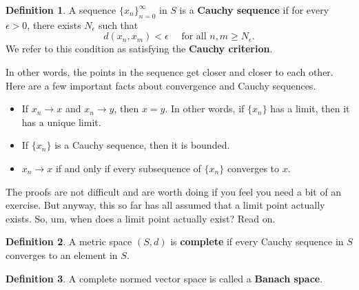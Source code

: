 \documentclass[12pt]{article}
\theoremstyle{definition}
\newtheorem{definition}{Definition}
\begin{document}
\begin{definition}
	A sequence  $\{x_n\}_{n=0}^{\infty}$  in $S$ is a \textbf{Cauchy sequence} if for every $\epsilon > 0$, there exists $N_{\epsilon}$ such that 
		\[d(x_n, x_m) < \epsilon \quad \text{ for all } n, m \geq N_{\epsilon}.	\]
	We refer to this condition as satisfying the \textbf{Cauchy criterion}. 
\end{definition}

In other words, the points in the sequence get closer and closer to each other. Here are a few important facts about convergence and Cauchy sequences.

\begin{itemize}
	\itemsep0em
	\item If $x_n \rightarrow x$ and $x_n \rightarrow y$, then $x=y$. In other words, if $\{x_n\}$ has a limit, then it has a unique limit. 
	\item If $\{x_n\}$ is a Cauchy sequence, then it is bounded.
	\item $x_n \rightarrow x$ if and only if every subsequence of $\{x_n\}$ converges to $x$. 
\end{itemize}
The proofs are not difficult and are worth doing if you feel you need a bit of an exercise. But anyway, this so far has all assumed that a limit point actually exists. So, um, when does a limit point actually exist? Read on.

\begin{definition}
	A metric space $(S, d)$ is \textbf{complete} if every Cauchy sequence in $S$ converges to an element in $S$.
\end{definition}

\begin{definition}
	A complete normed vector space is called a \textbf{Banach space}. 
\end{definition}
\end{document}
